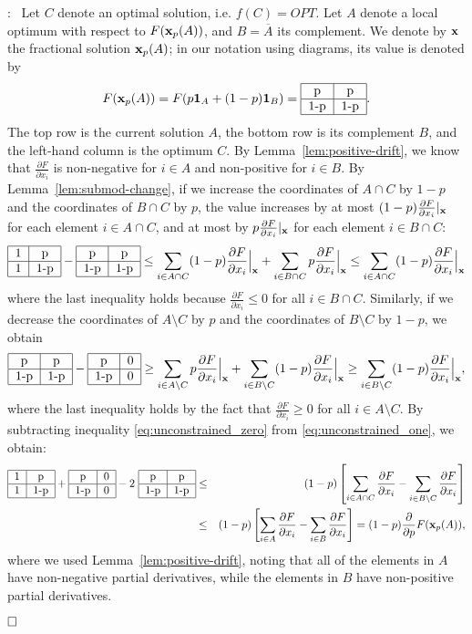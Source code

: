 \documentclass{article}[11pt]
\newcommand{\partdiff}[2]{\frac{\partial {#1}}{\partial {#2}}}
\renewenvironment{proof}{\noindent{\bf Proof}:~}{$\hfill \Box$\\}
\newcommand{\T}[4] {\begin{tabular}{|c|c|}
\hline
#1 & #2 \\
\hline
#3 & #4 \\
\hline
\end{tabular}}
\def\b1{{\bf 1}}
\def\bx{{\bf x}}
\begin{document}
\iffalse
\begin{proof}
Let $C$ denote an optimal solution, i.e. $f(C) = OPT$.
Let $A$ denote a local optimum with respect to $F(\bx_p(A))$, and $B = \overline{A}$ its complement.
We denote by $\bx$ the fractional solution $\bx_p(A)$; in our notation using diagrams,
its value is denoted by
$$ F(\bx_p(A)) = F(p \b1_A + (1-p) \b1_B) = \T{p}{p}{1-p}{1-p}.$$
The top row is the current solution $A$, the bottom row is its complement $B$,
and the left-hand column is the optimum $C$.
By Lemma~\ref{lem:positive-drift}, we know that $\partdiff{F}{x_i}$ is non-negative
for $i \in A$ and non-positive for $i\in B$.
By Lemma~\ref{lem:submod-change},
if we increase the coordinates of $A \cap C$ by $1-p$ and the coordinates of $B \cap C$
by $p$, the value increases by at most $(1-p) \partdiff{F}{x_i} |_\bx$ for each element
$i \in A \cap C$, and at most by $p \partdiff{F}{x_i} |_\bx$ for each element
$i \in B \cap C$:
\begin{equation}
\label{eq:unconstrained_one}
\T{1}{p}{1}{1-p} - \T{p}{p}{1-p}{1-p} \leq 
 \sum_{i\in A\cap{C}}(1-p) \partdiff{F}{x_i}\Big|_\bx
  + \sum_{i\in B\cap{C}}p\partdiff{F}{x_i} \Big|_\bx
 \leq  \sum_{i\in A\cap {C}}(1-p)\partdiff{F}{x_i} \Big|_\bx
\end{equation}
where the last inequality holds because $\partdiff{F}{x_i} \leq 0$ for all $i \in B \cap C$.
Similarly, if we decrease the coordinates of $A \setminus C$ by $p$ and
the coordinates of $B \setminus C$ by $1-p$, we obtain
\begin{equation}
\label{eq:unconstrained_zero}
 \T{p}{p}{1-p}{1-p} - \T{p}{0}{1-p}{0} \geq
 \sum_{i\in A\setminus{C}}p \partdiff{F}{x_i} \Big|_\bx
 + \sum_{i\in B\setminus{C}}(1-p)\partdiff{F}{x_i} \Big|_\bx
 \geq \sum_{i\in B\setminus{C}}(1-p)\partdiff{F}{x_i} \Big|_\bx,
\end{equation}
where the last inequality holds by the fact that $\partdiff{F}{x_i} \geq 0$
 for all $i \in A\setminus{C}$. 
By subtracting inequality \eqref{eq:unconstrained_zero} from \eqref{eq:unconstrained_one},
we obtain:
\begin{eqnarray}
\label{eq:prior_differentialeq}
\T{1}{p}{1}{1-p} + \T{p}{0}{1-p}{0} - 2~ \T{p}{p}{1-p}{1-p} &\leq &(1-p)\left[ \sum_{i\in A\cap {C}}\partdiff{F}{x_i} - \sum_{i\in B\setminus{C}}\partdiff{F}{x_i}\right]\\
& \leq &  (1-p) \left[ \sum_{i \in A} \partdiff{F}{x_i} -
 \sum_{i \in B} \partdiff{F}{x_i} \right] =
 (1-p) \partdiff{}{p} F(\bx_p(A)), \nonumber
\end{eqnarray}
where we used Lemma~\ref{lem:positive-drift}, noting that all of the elements in $A$
have non-negative partial derivatives, while the elements in $B$ have non-positive partial derivatives.


\end{proof}
\end{document}

